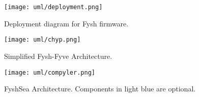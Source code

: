 \begin{figure}[h]
	\centering
	\texttt{[image: uml/deployment.png]}
	\caption{Deployment diagram for Fysh firmware.}
	\label{fig:deployment}
\end{figure}

\begin{figure}[h]
	\centering
	\texttt{[image: uml/chyp.png]}
	\caption{Simplified Fysh-Fyve Architecture.}
	\label{fig:component}
\end{figure}

\begin{figure}[h]
	\centering
	\texttt{[image: uml/compyler.png]}
	\caption{FyshSea Architecture. Components in light blue are optional.}
	\label{fig:component}
\end{figure}

